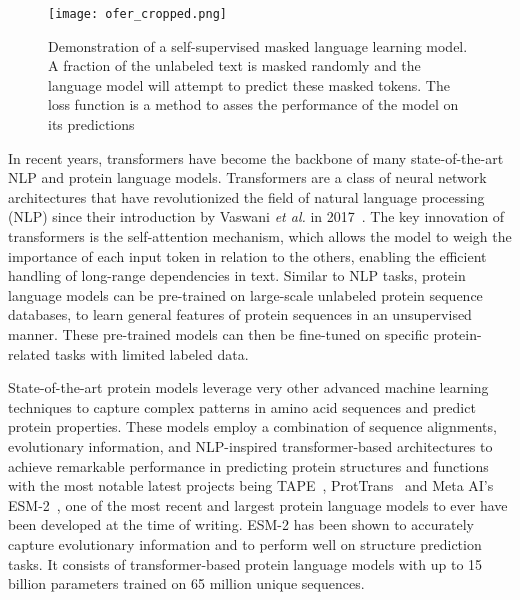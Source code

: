 \begin{figure}[h]
    \centering
    \texttt{[image: ofer\_cropped.png]}
    \caption{Demonstration of a self-supervised masked language learning model. A fraction of the unlabeled text is masked randomly and the language model will attempt to predict these masked tokens. The loss function is a method to asses the performance of the model on its predictions}
    \label{fig:ofer}
\end{figure}

In recent years, transformers have become the backbone of many state-of-the-art NLP and protein language models. Transformers are a class of neural network architectures that have revolutionized the field of natural language processing (NLP) since their introduction by Vaswani \textit{et al.} in 2017~\cite{transform}. The key innovation of transformers is the self-attention mechanism, which allows the model to weigh the importance of each input token in relation to the others, enabling the efficient handling of long-range dependencies in text. Similar to NLP tasks, protein language models can be pre-trained on large-scale unlabeled protein sequence databases, to learn general features of protein sequences in an unsupervised manner. These pre-trained models can then be fine-tuned on specific protein-related tasks with limited labeled data.

State-of-the-art protein models leverage very other advanced machine learning techniques to capture complex patterns in amino acid sequences and predict protein properties. These models employ a combination of sequence alignments, evolutionary information, and NLP-inspired transformer-based architectures to achieve remarkable performance in predicting protein structures and functions with the most notable latest projects being TAPE~\cite{tape}, ProtTrans~\cite{prottrans} and Meta AI's ESM-2~\cite{esm2}, one of the most recent and largest protein language models to ever have been developed at the time of writing. ESM-2 has been shown to accurately capture evolutionary information and to perform well on structure prediction tasks. It consists of transformer-based protein language models with up to 15 billion parameters trained on 65 million unique sequences.

